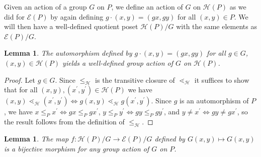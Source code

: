 \documentclass[10 pt]{amsart}
\theoremstyle{plain}
\newtheorem{lem}[thm]{Lemma}
\theoremstyle{definition}
\theoremstyle{remark}
\numberwithin{equation}{section}
\renewcommand{\iff}{\Leftrightarrow}
\newcommand\rk{\operatorname{rk}}
\begin{document}
Given an action of a group $G$ on $P$, we define an action of $G$ on $\mathcal{H}(P)$ as we did for $\mathcal{E}(P)$ by again defining $g\cdot (x,y) = (gx,gy)$ for all $(x,y)\in P$.  We will then have a well-defined quotient poset $\mathcal{H}(P)/G$ with the same elements as $\mathcal{E}(P)/G$.


\begin{lem}
\label{lem:G_action_on_HP}
The automorphism defined by $g\cdot (x, y)= (gx, gy)$ for all $g\in G$, $(x, y)\in \mathcal{H}(P)$ yields a well-defined group action of $G$ on $\mathcal{H}(P)$.
\end{lem}

\begin{proof}
Let $g\in G$.  Since $\le_{\mathcal{H}}$ is the transitive closure of $\lessdot_{\mathcal{H}}$ it suffices to show that for all $(x,y),(x^\prime,y^\prime)\in \mathcal{H}(P)$ we have $(x, y) \lessdot_{\mathcal H} (x^\prime,y^\prime) \iff g(x, y) \lessdot_{\mathcal H} g(x^\prime, y^\prime)$.  Since $g$ is an automorphism of $P$, we have $x\le_P x^\prime \iff gx\le_P gx^\prime$, $y\le_P y^\prime \iff gy\le_P gy^\prime$, and $y\neq x^\prime \iff gy\neq gx^\prime$, so the result follows from the definition of $\le_{\mathcal{H}}$.
\end{proof}







\begin{lem}
\label{lem:bijection_h_f}
The map $f:\mathcal H(P)/G \rightarrow \mathcal E(P)/G$ defined by $G(x,y) \mapsto G(x,y)$ is a bijective morphism for any group action of $G$ on $P$.
\end{lem}
\end{document}

